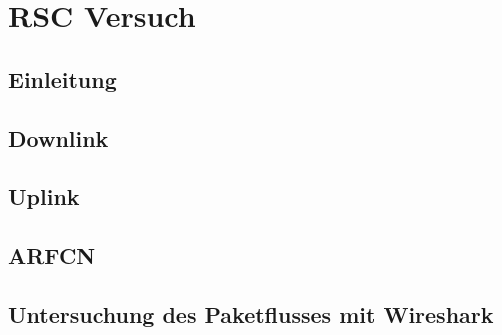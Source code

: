 
\chapter{RSC Versuch}
\section{Einleitung}

\section{Downlink}

\section{Uplink}

\section{ARFCN}


\section{Untersuchung des Paketflusses mit Wireshark}

